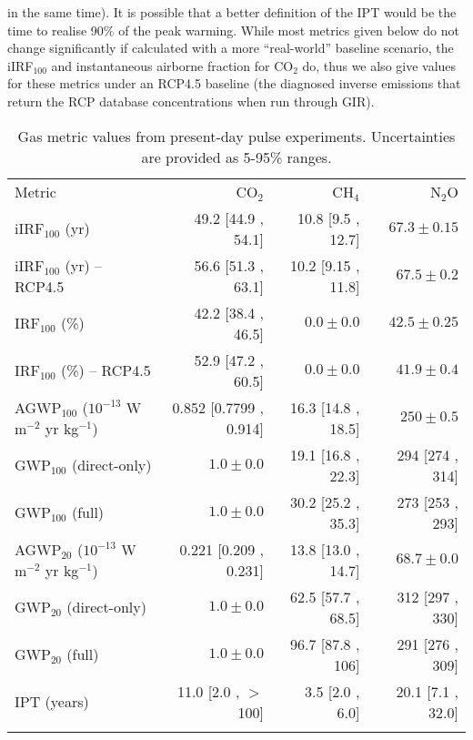 \documentclass[gmd, manuscript]{copernicus}
\begin{document}
in the same time). It is possible that a better definition of the IPT would be the time to realise 90\% of the peak warming. While most metrics given below do not change significantly if calculated with a more ``real-world'' baseline scenario, the iIRF$_{100}$ and instantaneous airborne fraction for CO$_2$ do, thus we also give values for these metrics under an RCP4.5 baseline (the diagnosed inverse emissions that return the RCP database concentrations when run through GIR).\\

\begin{table}[t]
    \caption{Gas metric values from present-day pulse experiments. Uncertainties are provided as 5-95\% ranges.} \label{tab:metricresults}
    \begin{tabular}{l r r r}
    \tophline
        Metric & CO$_2$ & CH$_4$ & N$_2$O\\
    \middlehline
        iIRF$_{100}$ (yr) & 49.2 [44.9 , 54.1] & 10.8 [9.5 , 12.7] & $67.3 \pm 0.15$ \\
        iIRF$_{100}$ (yr) -- RCP4.5 & 56.6 [51.3 , 63.1] & 10.2 [9.15 , 11.8] & $67.5 \pm 0.2$ \\
        IRF$_{100}$ (\%) & 42.2 [38.4 , 46.5] & $0.0 \pm 0.0$ & $42.5 \pm 0.25$ \\
        IRF$_{100}$ (\%) -- RCP4.5 & 52.9 [47.2 , 60.5] & $0.0 \pm 0.0$ & $41.9 \pm 0.4$ \\
        AGWP$_{100}$ ($10^{-13}$ W m$^{-2}$ yr kg$^{-1}$) & 0.852 [0.7799 , 0.914] & 16.3 [14.8 , 18.5] & $250 \pm 0.5$ \\ 
        GWP$_{100}$ (direct-only) & $1.0 \pm 0.0$ & 19.1 [16.8 , 22.3] & 294 [274 , 314] \\
        GWP$_{100}$ (full) & $1.0 \pm 0.0$ & 30.2 [25.2 , 35.3] & 273 [253 , 293] \\
        AGWP$_{20}$ ($10^{-13}$ W m$^{-2}$ yr kg$^{-1}$) & 0.221 [0.209 , 0.231] & 13.8 [13.0 , 14.7] & $68.7 \pm 0.0$ \\ 
        GWP$_{20}$ (direct-only) & $1.0 \pm 0.0$ & 62.5 [57.7 , 68.5] & 312 [297 , 330] \\
        GWP$_{20}$ (full) & $1.0 \pm 0.0$ & 96.7 [87.8 , 106] & 291 [276 , 309] \\
        IPT (years) & 11.0 [2.0 , $>$100] & 3.5 [2.0 , 6.0] & 20.1 [7.1 , 32.0] \\
    \bottomhline
    \end{tabular}
    \belowtable{} %
\end{table}
\end{document}
